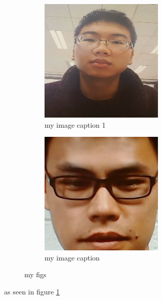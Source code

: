 \documentclass[a4paper,twocolumn]{article}
\begin{document}
\begin{figure}
	\begin{subfigure} {0.22\textwidth}
		\includegraphics[width=\linewidth, angle=0,]{1_1_09_2f_37.png}
		\caption{my image caption 1}
		\label{fig gggggg}
		
	\end{subfigure}%
	\begin{subfigure} {0.22\textwidth}
		\includegraphics[width=\linewidth, angle=0,]{129-2-3-3-1f_385.png}
		\caption{my image caption}
		
	\end{subfigure}
	\caption{my figs}
\end{figure}

as seen in figure \ref{fig gggggg}


\lipsum


  
\end{document}

